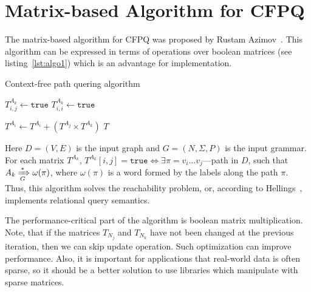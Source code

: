 \section{Matrix-based Algorithm for CFPQ}

The matrix-based algorithm for CFPQ was proposed by Rustam Azimov~\cite{Azimov:2018:CPQ:3210259.3210264}.
This algorithm can be expressed in terms of operations over boolean matrices (see listing~\ref{lst:algo1}) which is an advantage for implementation.

\begin{algorithm}
\begin{algorithmic}[1]
\caption{Context-free path quering algorithm}
\label{lst:algo1}

          {$T^{A_k}_{i,j} \gets \texttt{true}$}
        \EndFor
    \EndFor
       {$T^{A_k}_{i,i} \gets \texttt{true}$}
    \EndFor

          {$T^{A_i} \gets T^{A_i} + (T^{A_j} \times T^{A_k})$}
        \EndFor
    \EndWhile
\State \Return $T$
\EndFunction
\end{algorithmic}
\end{algorithm}

Here $D = (V, E)$ is the input graph and $G = (N,\Sigma,P)$ is the input grammar.
For each matrix $T^{A_k}$, $T^{A_k}[i,j] = \texttt{true} \iff \exists \pi = v_i \ldots v_j $---path in $D$, such that $A_k \xRightarrow[G]{*} \omega(\pi) $, where $\omega(\pi)$ is a word formed by the labels along the path $\pi$.
Thus, this algorithm solves the reachability problem, or, according to Hellings~\cite{hellingsRelational}, implements relational query semantics.

The performance-critical part of the algorithm is boolean matrix multiplication.
Note, that if the matrices $T_{N_j}$ and $T_{N_k}$ have not been changed at the previous iteration, then we can skip update operation.
Such optimization can improve performance.
Also, it is important for applications that real-world data is often sparse, so it should be a better solution to use libraries which manipulate with sparse matrices.
